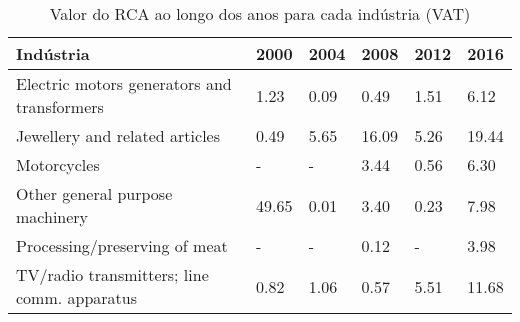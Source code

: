 \begin{table}
\centering
\caption{Valor do RCA ao longo dos anos para cada indústria (VAT)}
\label{tab:ex3-tempo-VAT}
\begin{tabular}{p{6cm}p{1.5cm}p{1.5cm}p{1.5cm}p{1.5cm}p{1.5cm}}
\toprule
                                  Indústria &  2000 & 2004 &  2008 & 2012 &  2016 \\
\midrule
Electric motors generators and transformers &  1.23 & 0.09 &  0.49 & 1.51 &  6.12 \\
             Jewellery and related articles &  0.49 & 5.65 & 16.09 & 5.26 & 19.44 \\
                                Motorcycles &     - &    - &  3.44 & 0.56 &  6.30 \\
            Other general purpose machinery & 49.65 & 0.01 &  3.40 & 0.23 &  7.98 \\
              Processing/preserving of meat &     - &    - &  0.12 &    - &  3.98 \\
TV/radio transmitters; line comm. apparatus &  0.82 & 1.06 &  0.57 & 5.51 & 11.68 \\
\bottomrule
\end{tabular}
\end{table}
